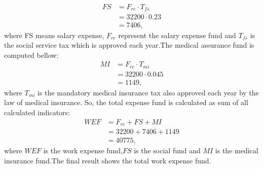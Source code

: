 \begin{equation}
\label{eq:sf}
\begin{split}
FS  &= F_{re} \cdot T_{fs} \\
	&= 32200 \cdot 0.23  \\	
	&= 7406,
\end{split}
\end{equation}
\noindent
where FS means salary expense, $F_{re}$ represent the salary expense fund and $T_{fs}$ is the social service tax which is approved each year.The medical assurance fund is computed bellow:
\begin{equation}
\label{eq:sf}
\begin{split}
MI  &= F_{re} \cdot T_{mi}\\ 
	&= 32200 \cdot 0.045\\ 
	&= 1149,
\end{split}
\end{equation}
where $T_{mi}$ is the mandatory medical insurance tax also approved each year by the law of medical insurance.
So, the total expense fund is calculated as sum of all calculated indicators:
\begin{equation}
\label{eq:sf}
	\begin{split}
	WEF  &=  F_{re} + FS + MI\\ 
	&= 32200 + 7406 + 1149\\ 
	&= 40775,
	\end{split}
\end{equation}
where $WEF$ is the work expense fund,$FS$ is the social fund and $MI$ is the medical insurance fund.The final result shows the total work expense fund.
